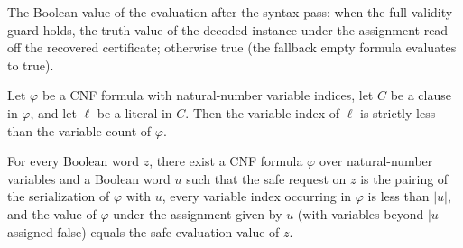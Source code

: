 \begin{definition}
\label{Complexity.satSafeValue}
\leanok
{}
The Boolean value of the evaluation after the syntax pass: when the full validity
guard holds, the truth value of the decoded instance under the assignment read off
the recovered certificate; otherwise true (the fallback empty formula evaluates to
true).
\end{definition}

\begin{lemma}
\label{Complexity.sat_literal_lt_numVars}
\leanok
{}
Let $\varphi$ be a CNF formula with natural-number variable indices, let $C$ be a clause
in $\varphi$, and let $\ell$ be a literal in $C$. Then the variable index of $\ell$ is
strictly less than the variable count of $\varphi$.
\end{lemma}

\begin{lemma}
\label{Complexity.satSafe_spec}
\leanok
{}
For every Boolean word $z$, there exist a CNF formula $\varphi$ over natural-number
variables and a Boolean word $u$ such that the safe request on $z$ is the pairing of the
serialization of $\varphi$ with $u$, every variable index occurring in $\varphi$ is less
than $|u|$, and the value of $\varphi$ under the assignment given by $u$ (with variables
beyond $|u|$ assigned false) equals the safe evaluation value of $z$.
\end{lemma}

